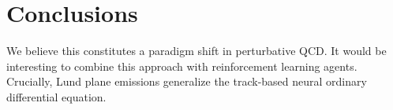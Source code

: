 \section{Conclusions}\label{sec:conclusions}

We believe this constitutes a paradigm shift in perturbative QCD. It
would be interesting to combine this approach with reinforcement
learning agents. Crucially, Lund plane emissions generalize the
track-based neural ordinary differential equation.

